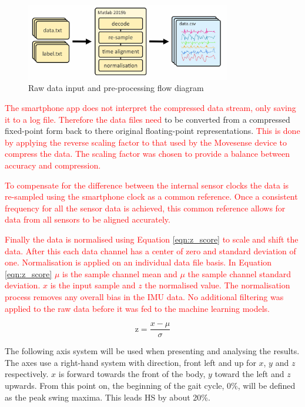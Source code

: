 \documentclass[sensors,article,submit,moreauthors,pdftex]{Definitions/mdpi}
\begin{document}
\begin{figure}[!hbt]
    \centering
    \includegraphics[width=0.8\textwidth]{Figures/movesense/data_processing.jpg}
    \caption{Raw data input and pre-processing flow diagram}
    \label{fig:data_processing}
\end{figure}

\textcolor{red}{The smartphone app does not interpret the compressed data stream, only saving it to a log file. Therefore the data files need} to be converted from a compressed fixed-point form back to there original floating-point representations. \textcolor{red}{This is done by applying the reverse scaling factor to that used by the Movesense device to compress the data. The scaling factor was chosen to provide a balance between accuracy and compression.}

\textcolor{red}{To compensate for the difference between the internal sensor clocks the data is re-sampled using the smartphone clock as a common reference. Once a consistent frequency for all the sensor data is achieved, this common reference allows for data from all sensors to be aligned accurately.}

\textcolor{red}{Finally the data is normalised using Equation \ref{eqn:z_score} to scale and shift the data. After this each data channel has a center of zero and standard deviation of one. Normalisation is applied on an individual data file basis. In Equation \ref{eqn:z_score} $\mu$ is the sample channel mean and $\mu$ the sample channel standard deviation. $x$ is the input sample and $z$ the normalised value. The normalisation process removes any overall bias in the IMU data. No additional filtering was applied to the raw data before it was fed to the machine learning models.}

\begin{equation}
    \text{z} = \frac{x-\mu}{\sigma}
    \label{eqn:z_score}
\end{equation}

The following axis system will be used when presenting and analysing the results. The axes use a right-hand system with direction, front left and up for $x$, $y$ and $z$ respectively. $x$ is forward towards the front of the body, $y$ toward the left and $z$ upwards. From this point on, the beginning of the gait cycle, 0\%, will be defined as the peak swing maxima. This leads HS by about 20\%. 
\end{document}

